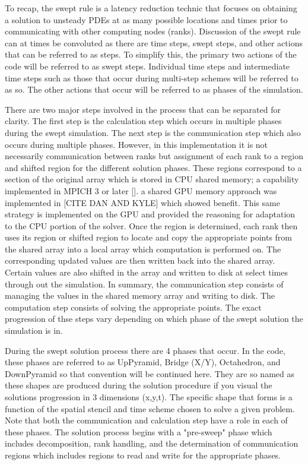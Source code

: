 \documentclass[review]{elsarticle}
\begin{document}
\par
To recap, the swept rule is a latency reduction technic that focuses on obtaining a solution to unsteady PDEs at as many possible locations and times prior to communicating with other computing nodes (ranks). Discussion of the swept rule can at times be convoluted as there are time steps, swept steps, and other actions that can be referred to as steps. To simplify this, the primary two actions of the code will be referred to as swept steps. Individual time steps and intermediate time steps such as those that occur during multi-step schemes will be referred to as so. The other actions that occur will be referred to as phases of the simulation.

\par
There are two major steps involved in the process that can be separated for clarity. The first step is the calculation step which occurs in multiple phases during the swept simulation. The next step is the communication step which also occurs during multiple phases. However, in this implementation it is not necessarily communication between ranks but assignment of each rank to a region and shifted region for the different solution phases. These regions correspond to a section of the original array which is stored in CPU shared memory; a capability implemented in MPICH 3 or later []. a shared GPU memory approach was implemented in [CITE DAN AND KYLE] which showed benefit. This same strategy is implemented on the GPU and provided the reasoning for adaptation to the CPU portion of the solver. Once the region is determined, each rank then uses its region or shifted region to locate and copy the appropriate points from the shared array into a local array which computation is performed on. The corresponding updated values are then written back into the shared array. Certain values are also shifted in the array and written to disk at select times through out the simulation. In summary, the communication step consists of managing the values in the shared memory array and writing to disk. The computation step consists of solving the appropriate points. The exact progression of thse steps vary depending on which phase of the swept solution the simulation is in.

\par
During the swept solution process there are 4 phases that occur. In the code, these phases are referred to as UpPyramid, Bridge (X/Y), Octahedron, and DownPyramid so that convention will be continued here. They are so named as these shapes are produced during the solution procedure if you visual the solutions progression in 3 dimensions (x,y,t). The specific shape that forms is a function of the spatial stencil and time scheme chosen to solve a given problem. Note that both the communication and calculation step have a role in each of these phases.
The solution process begins with a "pre-sweep" phase which includes decomposition, rank handling, and the determination of communication regions which includes regions to read and write for the appropriate phases.
\end{document}
